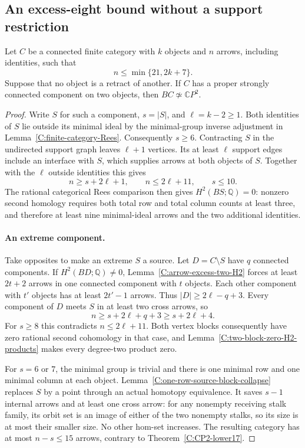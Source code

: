 \subsection{An excess-eight bound without a support restriction}

\begin{proposition}\label{C:strong-pair-excess-eight-through21}
Let $C$ be a connected finite category with $k$ objects and $n$ arrows,
including identities, such that
\[
 n\leq\min\{21,2k+7\}.
\]
Suppose that no object is a retract of another. If $C$ has a proper
strongly connected component on two objects, then
$BC\not\simeq\mathbb CP^2$.
\end{proposition}
\begin{proof}
Write $S$ for such a component, $s=|S|$, and $\ell=k-2\geq1$.
Both identities of $S$ lie outside its minimal ideal by the
minimal-group inverse adjustment in Lemma~\ref{C:finite-category-Rees}.
Consequently $s\geq6$. Contracting $S$ in the undirected support graph
leaves $\ell+1$ vertices. Its at least $\ell$ support edges include
an interface with $S$, which supplies arrows at both objects of $S$.
Together with the $\ell$ outside identities this gives
\[
 n\geq s+2\ell+1,\qquad n\leq2\ell+11,\qquad s\leq10.
\]
The rational categorical Rees comparison then gives
$H^2(BS;\mathbb Q)=0$: nonzero second homology requires both total
row and total column counts at least three, and therefore at least
nine minimal-ideal arrows and the two additional identities.

\paragraph{An extreme component.}
Take opposites to make an extreme $S$ a source. Let
$D=C\setminus S$ have $q$ connected components. If
$H^2(BD;\mathbb Q)\ne0$, Lemma~\ref{C:arrow-excess-two-H2}
forces at least $2t+2$ arrows in one connected component with $t$
objects. Each other component with $t'$ objects has at least
$2t'-1$ arrows. Thus $|D|\geq2\ell-q+3$.
Every component of $D$ meets $S$ in at least two cross arrows,
so
\[
 n\geq s+2\ell+q+3\geq s+2\ell+4.
\]
For $s\geq8$ this contradicts $n\leq2\ell+11$.
Both vertex blocks consequently have zero rational second
cohomology in that case, and
Lemma~\ref{C:two-block-zero-H2-products} makes every degree-two
product zero.

For $s=6$ or $7$, the minimal group is trivial and there is one
minimal row and one minimal column at each object.
Lemma~\ref{C:one-row-source-block-collapse} replaces $S$ by a point
through an actual homotopy equivalence. It saves $s-1$ internal
arrows and at least one cross arrow: for any nonempty receiving
stalk family, its orbit set is an image of either of the two
nonempty stalks, so its size is at most their smaller size.
No other hom-set increases. The resulting category has at most
$n-s\leq15$ arrows, contrary to Theorem~\ref{C:CP2-lower17}.


\end{proof}
